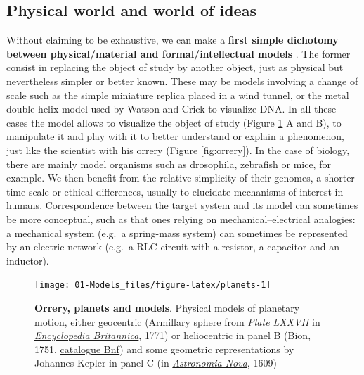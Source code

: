 \documentclass[a4paper,12pt,twoside,onecolumn,openright,final,oldfontcommands]{memoir}
\begin{document}
\subsection{Physical world and world of
ideas}\label{physical-world-and-world-of-ideas}

Without claiming to be exhaustive, we can make a \textbf{first simple
dichotomy between physical/material and formal/intellectual models}
\citep{rosenblueth1945role}. The former consist in replacing the object
of study by another object, just as physical but nevertheless simpler or
better known. These may be models involving a change of scale such as
the simple miniature replica placed in a wind tunnel, or the metal
double helix model used by Watson and Crick to visualize DNA. In all
these cases the model allows to visualize the object of study (Figure
\ref{fig:planets} A and B), to manipulate it and play with it to better
understand or explain a phenomenon, just like the scientist with his
orrery (Figure \ref{fig:orrery}). In the case of biology, there are
mainly model organisms such as drosophila, zebrafish or mice, for
example. We then benefit from the relative simplicity of their genomes,
a shorter time scale or ethical differences, usually to elucidate
mechanisms of interest in humans. Correspondence between the target
system and its model can sometimes be more conceptual, such as that ones
relying on mechanical--electrical analogies: a mechanical system (e.g.~a
spring-mass system) can sometimes be represented by an electric network
(e.g.~a RLC circuit with a resistor, a capacitor and an inductor).

\begin{figure}

{\centering \texttt{[image: 01-Models\_files/figure-latex/planets-1]} 

}

\caption[Orrery, planets and models]{\textbf{Orrery, planets and models}. Physical
models of planetary motion, either geocentric (Armillary sphere from
\emph{Plate LXXVII} in
\href{https://commons.wikimedia.org/wiki/File:EB1711_Armillary_Sphere.png}{\emph{Encyclopedia
Britannica}}, 1771) or heliocentric in panel B (Bion, 1751,
\href{https://gallica.bnf.fr/ark:/12148/btv1b2600252q/f8.item.r=Bion}{catalogue
Bnf}) and some geometric representations by Johannes Kepler in panel C
(in
\href{https://commons.wikimedia.org/wiki/File:Kepler_astronomia_nova.jpg}{\emph{Astronomia
Nova}}, 1609)}\label{fig:planets}
\end{figure}
\end{document}
